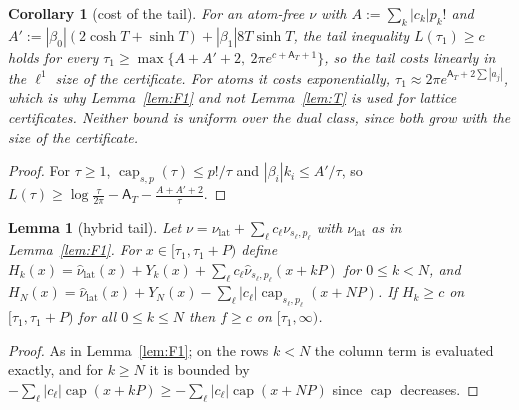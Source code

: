 \documentclass[10pt]{amsart}
\newtheorem{lemma}[theorem]{Lemma}
\newtheorem{corollary}[theorem]{Corollary}
\theoremstyle{definition}
\theoremstyle{remark}
\newcommand{\nuh}{\widehat\nu}
\newcommand{\Aconst}{\mathsf A_T}
\begin{document}
\begin{corollary}[cost of the tail]\label{cor:T2}
For an atom-free $\nu$ with $A:=\sum_k|c_k|p_k!$ and $A':=|\beta_0|(2\cosh T+\sinh T)+|\beta_1|8T\sinh T$,
the tail inequality $L(\tau_1)\ge c$ holds for every $\tau_1\ge\max\{A+A'+2,\ 2\pi e^{c+\Aconst+1}\}$,
so the tail costs linearly in the $\ell^1$ size of the certificate. For atoms it costs
exponentially, $\tau_1\approx2\pi e^{\Aconst+2\sum|a_j|}$, which is why Lemma~\ref{lem:F1} and not
Lemma~\ref{lem:T} is used for lattice certificates. Neither bound is uniform over the dual class,
since both grow with the size of the certificate.
\end{corollary}
\begin{proof}
For $\tau\ge1$, $\operatorname{cap}_{s,p}(\tau)\le p!/\tau$ and $|\beta_i|k_i\le A'/\tau$, so
$L(\tau)\ge\log\frac\tau{2\pi}-\Aconst-\frac{A+A'+2}{\tau}$.
\end{proof}

\begin{lemma}[hybrid tail]\label{lem:hybrid}
Let $\nu=\nu_{\mathrm{lat}}+\sum_\ell c_\ell\nu_{s_\ell,p_\ell}$ with $\nu_{\mathrm{lat}}$ as in Lemma~\ref{lem:F1}.
For $x\in[\tau_1,\tau_1+P)$ define $H_k(x)=\nuh_{\mathrm{lat}}(x)+Y_k(x)+\sum_\ell c_\ell\nuh_{s_\ell,p_\ell}(x+kP)$
for $0\le k<N$, and $H_N(x)=\nuh_{\mathrm{lat}}(x)+Y_N(x)-\sum_\ell|c_\ell|\operatorname{cap}_{s_\ell,p_\ell}(x+NP)$.
If $H_k\ge c$ on $[\tau_1,\tau_1+P)$ for all $0\le k\le N$ then $f\ge c$ on $[\tau_1,\infty)$.
\end{lemma}
\begin{proof}
As in Lemma~\ref{lem:F1}; on the rows $k<N$ the column term is evaluated exactly, and for
$k\ge N$ it is bounded by $-\sum_\ell|c_\ell|\operatorname{cap}(x+kP)\ge-\sum_\ell|c_\ell|\operatorname{cap}(x+NP)$
since $\operatorname{cap}$ decreases.
\end{proof}
\end{document}
